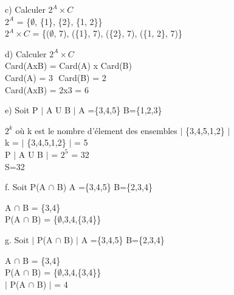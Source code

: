 c) Calculer $2^{A}×C$ \\

$2^{A}$ =  \{$\emptyset$, \{1\}, \{2\}, \{1, 2\}\} \\

$2^{A}×C$ = \{($\emptyset$, 7), (\{1\}, 7), (\{2\}, 7), (\{1, 2\}, 7)\} \\

\vspace{5mm} %

d) Calculer $2^{A}×C$ \\

Card(AxB) = Card(A) x Card(B) \\

Card(A) = 3 $ $ Card(B) = 2 \\

Card(AxB) = 2x3 = 6 \\

\newpage

e) Soit P $|$ A U B $|$ A =\{3,4,5\} B=\{1,2,3\}
\vspace{3mm} %

$2^{k}$ où k est le nombre d'élement des ensembles $|$ \{3,4,5,1,2\} $|$ \\

k = $|$ \{3,4,5,1,2\} $|$ = 5 \\

P $|$ A U B $|$ = $2^{5}$ = 32 \\

S=32 \\
\vspace{3mm} %

f. Soit P(A $\cap$ B)  A =\{3,4,5\} B=\{2,3,4\}
\vspace{3mm} %

A $\cap$ B = \{3,4\} \\

P(A $\cap$ B) = \{$\emptyset$,3,4,\{3,4\}\} \\
\vspace{3mm} %


g. Soit $|$ P(A $\cap$ B) $|$ A =\{3,4,5\} B=\{2,3,4\}
\vspace{3mm} %

A $\cap$ B = \{3,4\} \\

P(A $\cap$ B) = \{$\emptyset$,3,4,\{3,4\}\} \\

$|$ P(A $\cap$ B) $|$ = 4 \\
